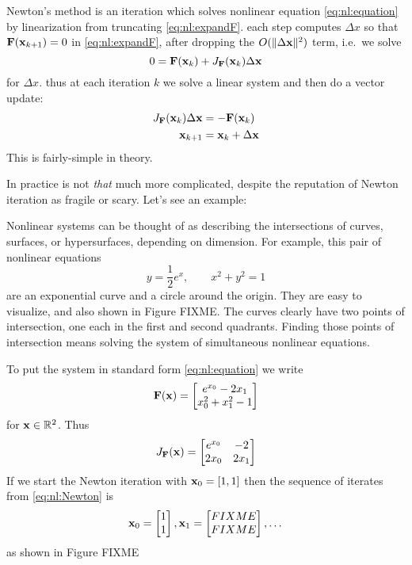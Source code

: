 Newton's method is an iteration which solves nonlinear equation \eqref{eq:nl:equation} by linearization from truncating \eqref{eq:nl:expandF}.  each step computes $\Delta x$ so that $\mathbf{F}(\mathbf{x}_{k+1})=0$ in \eqref{eq:nl:expandF}, after dropping the $O(\|\Delta\mathbf{x}\|^2)$ term, i.e.~we solve
\begin{equation}
    0 = \mathbf{F}(\mathbf{x}_k) + J_{\mathbf{F}}(\mathbf{x}_k) \Delta\mathbf{x}
\end{equation}
for $\Delta x$.  thus at each iteration $k$ we solve a linear system and then do a vector update:
\begin{align}
    J_{\mathbf{F}}(\mathbf{x}_k) \Delta\mathbf{x} &= - \mathbf{F}(\mathbf{x}_k)  \label{eq:nl:Newton}  \\
    \mathbf{x}_{k+1} &= \mathbf{x}_k + \Delta\mathbf{x}  \notag
\end{align}
This is fairly-simple in theory.

In practice is not \emph{that} much more complicated, despite the reputation of Newton iteration as fragile or scary.  Let's see an example:

\medskip\noindent\hrulefill
\begin{example}  Nonlinear systems can be thought of as describing the intersections of curves, surfaces, or hypersurfaces, depending on dimension.  For example, this pair of nonlinear equations
    $$y = \frac{1}{2} e^x, \qquad x^2+y^2 = 1$$
are an exponential curve and a circle around the origin.  They are easy to visualize, and also shown in Figure FIXME.  The curves clearly have two points of intersection, one each in the first and second quadrants.  Finding those points of intersection means solving the system of simultaneous nonlinear equations.

To put the system in standard form \eqref{eq:nl:equation} we write
\begin{equation}
\mathbf{F}(\mathbf{x}) = \begin{bmatrix}
           e^{x_0} - 2 x_1 \\
           x_0^2 + x_1^2 - 1
           \end{bmatrix}
\end{equation}
for $\mathbf{x}\in \mathbb{R}^2$.  Thus
\begin{equation}
J_{\mathbf{F}}(\mathbf{x}) = \begin{bmatrix}
    e^{x_0} & -2 \\
    2 x_0   & 2 x_1 \end{bmatrix}
\end{equation}
If we start the Newton iteration with $\mathbf{x}_0 = [1,1]$ then the sequence of iterates from \eqref{eq:nl:Newton} is
    $${\mathbf{x}}_{0} = \begin{bmatrix} 1 \\ 1 \end{bmatrix}, {\mathbf{x}}_{1} = \begin{bmatrix} FIXME \\ FIXME \end{bmatrix}, \dots$$
as shown in Figure FIXME
\end{example}
\noindent\hrulefill


